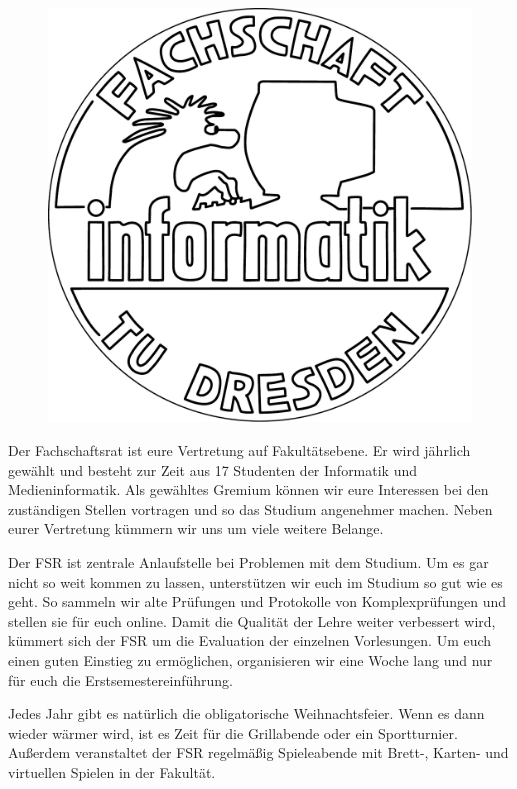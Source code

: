 

\begin{figure}\ \\[-2cm]
\flushright\includegraphics[width=.9\linewidth]{img/fsr_logo}
\end{figure}

Der Fachschaftsrat ist eure Vertretung auf Fakultätsebene.
Er wird jährlich gewählt und besteht zur Zeit aus 17 Studenten der Informatik und Medieninformatik.
Als gewähltes Gremium können wir eure Interessen bei den zuständigen Stellen vortragen und so das Studium angenehmer machen.
Neben eurer Vertretung kümmern wir uns um viele weitere Belange.

Der FSR ist zentrale Anlaufstelle bei Problemen mit dem Studium.
Um es gar nicht so weit kommen zu lassen, unterstützen wir euch im Studium so gut wie es geht.
So sammeln wir alte Prüfungen und Protokolle von Komplexprüfungen und stellen sie für euch online.
Damit die Qualität der Lehre weiter verbessert wird, kümmert sich der FSR um die Evaluation der einzelnen Vorlesungen.
Um euch einen guten Einstieg zu ermöglichen, organisieren wir eine Woche lang und nur für euch die Erstsemestereinführung.

Jedes Jahr gibt es natürlich die obligatorische Weihnachtsfeier.
Wenn es dann wieder wärmer wird, ist es Zeit für die Grillabende oder ein Sportturnier. \\
Außerdem veranstaltet der FSR regelmäßig Spieleabende mit Brett-, Karten- und virtuellen Spielen in der Fakultät.

